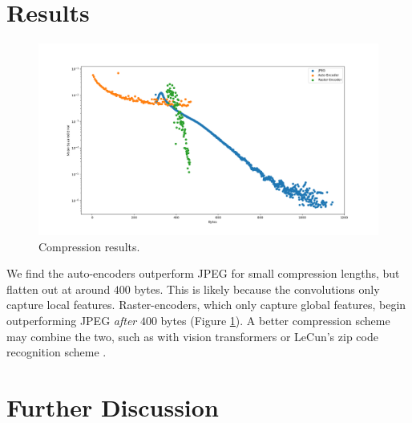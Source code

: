 \documentclass[11pt]{article}
\begin{document}
\section{Results}
\begin{figure}[h]
  \centering
  \includegraphics[width=2\columnwidth]{diagrams/results.png}
  \caption{Compression results.}
  \label{fig:results}
\end{figure}

We find the auto-encoders outperform JPEG for small compression lengths, but flatten out at around $400$ bytes. This is likely because the convolutions only capture local features. Raster-encoders, which only capture global features, begin outperforming JPEG \emph{after} $400$ bytes (Figure \ref{fig:results}). A better compression scheme may combine the two, such as with vision transformers or LeCun's zip code recognition scheme \citep{lecun-1989-zip}.

\section{Further Discussion}



\end{document}
